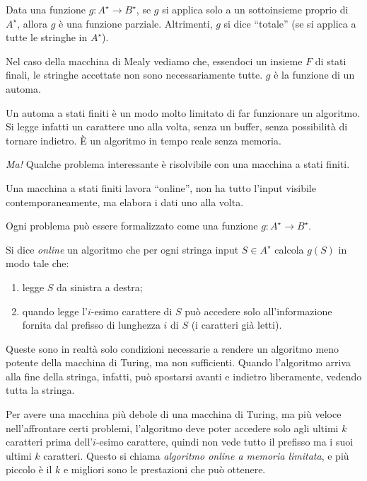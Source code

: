 Data una funzione $g : A^{\star} \to B^{\star}$, se $g$ si applica solo a un sottoinsieme proprio di $A^{\star}$, allora $g$ \`e una funzione parziale. Altrimenti, $g$ si dice ``totale'' (se si applica a tutte le stringhe in $A^{\star}$).

Nel caso della macchina di Mealy vediamo che, essendoci un insieme $F$ di stati finali, le stringhe accettate non sono necessariamente tutte. $g$ \`e la funzione di un automa.

Un automa a stati finiti \`e un modo molto limitato di far funzionare un algoritmo. Si legge infatti un carattere uno alla volta, senza un buffer, senza possibilit\`a di tornare indietro. \`E un algoritmo in tempo reale senza memoria.

\emph{Ma!} Qualche problema interessante \`e risolvibile con una macchina a stati finiti.

Una macchina a stati finiti lavora ``online'', non ha tutto l'input visibile contemporaneamente, ma elabora i dati uno alla volta.

Ogni problema pu\`o essere formalizzato come una funzione $g : A^{\star} \to B^{\star}$.

\begin{defn}
Si dice \emph{online} un algoritmo  che per ogni stringa input $S \in A^{\star}$ calcola $g(S)$ in modo tale che:
\begin{enumerate}
    \item {} legge $S$ da sinistra a destra;
    \item quando  legge l'$i$-esimo carattere di $S$ pu\`o accedere solo all'informazione fornita dal prefisso di lunghezza $i$ di $S$ (i caratteri gi\`a letti).
\end{enumerate}
Queste sono in realt\`a solo condizioni necessarie a rendere un algoritmo meno potente della macchina di Turing, ma non sufficienti. Quando l'algoritmo arriva alla fine della stringa, infatti, pu\`o spostarsi avanti e indietro liberamente, vedendo tutta la stringa.
\end{defn}

Per avere una macchina pi\`u debole di una macchina di Turing, ma pi\`u veloce nell'affrontare certi problemi, l'algoritmo deve poter accedere solo agli ultimi $k$ caratteri prima dell'$i$-esimo carattere, quindi non vede tutto il prefisso ma i suoi ultimi $k$ caratteri. Questo si chiama \emph{algoritmo online a memoria limitata}, e pi\`u piccolo \`e il $k$ e migliori sono le prestazioni che pu\`o ottenere.


